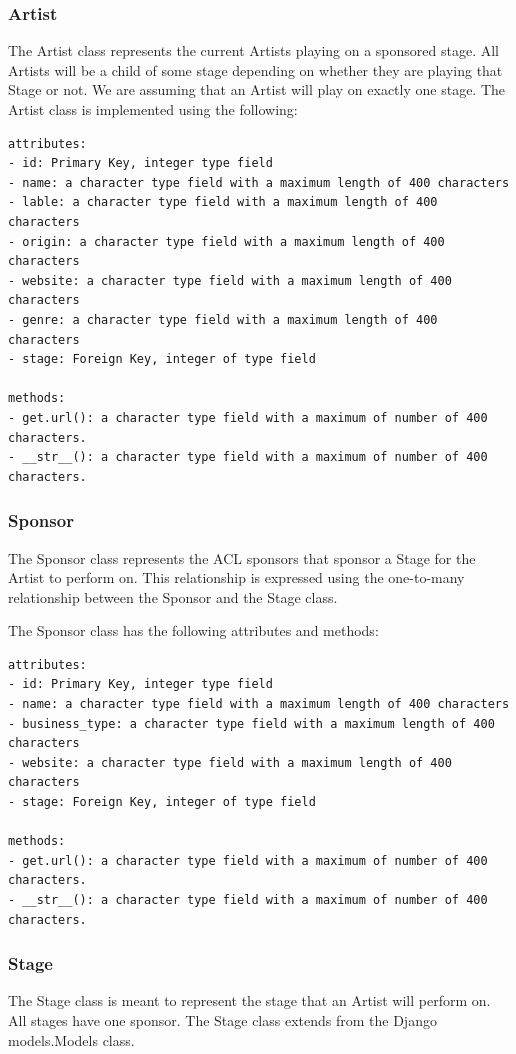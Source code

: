\documentclass[12pt,english]{scrartcl}
\begin{document}
\subsubsection{Artist}
The Artist class represents the current Artists playing on a sponsored stage. All Artists will be a child of some
stage depending on whether they are playing that Stage or not. We are assuming that an Artist will play on 
exactly one stage.
The Artist class is implemented using the following:
\begin{verbatim}
attributes:
- id: Primary Key, integer type field
- name: a character type field with a maximum length of 400 characters
- lable: a character type field with a maximum length of 400 characters
- origin: a character type field with a maximum length of 400 characters
- website: a character type field with a maximum length of 400 characters
- genre: a character type field with a maximum length of 400 characters
- stage: Foreign Key, integer of type field

methods:
- get.url(): a character type field with a maximum of number of 400 characters.
- __str__(): a character type field with a maximum of number of 400 characters.
\end{verbatim}


\subsubsection{Sponsor}
The Sponsor class represents the ACL sponsors that sponsor a Stage for the Artist to perform on.
This relationship is expressed using the one-to-many relationship between the Sponsor and the Stage
class. 

The Sponsor class has the following attributes and methods:
\begin{verbatim}
attributes:
- id: Primary Key, integer type field
- name: a character type field with a maximum length of 400 characters
- business_type: a character type field with a maximum length of 400 characters
- website: a character type field with a maximum length of 400 characters
- stage: Foreign Key, integer of type field

methods:
- get.url(): a character type field with a maximum of number of 400 characters.
- __str__(): a character type field with a maximum of number of 400 characters.
\end{verbatim}

\subsubsection{Stage}
The Stage class is meant to represent the stage that an Artist will perform on. All stages
have one sponsor. The Stage class extends from the Django models.Models class.
\end{document}
